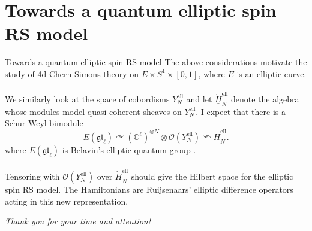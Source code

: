 \documentclass[11pt]{beamer}
\theoremstyle{remark}
\theoremstyle{remark}
\newcommand{\C}{\mathbb{C}}
\begin{document}
\section{Towards a quantum elliptic spin RS model}

\begin{frame}{Towards a quantum elliptic spin RS model}
The above considerations motivate the study of 4d Chern-Simons theory on $E \times S^1 \times [0,1]$, where $E$ is an elliptic curve.
\\~\\
We similarly look at the space of cobordisms $Y_N^\text{ell}$ and let $\underline{\dot H}_N^\text{ell}$ denote the algebra whose modules model quasi-coherent sheaves on $Y_N^\text{ell}$. I expect that there is a Schur-Weyl bimodule
\begin{equation*}
E(\mathfrak{gl}_\ell) \curvearrowright (\C^\ell)^{\otimes N} \otimes \mathcal{O}(Y_N^\text{ell}) \curvearrowleft \underline{\dot H}_N^\text{ell}.
\end{equation*}
where $E(\mathfrak{gl}_\ell)$ is Belavin's elliptic quantum group \cite{article:costello:2018b,article:etingof:1998}.
\\~\\
Tensoring with $\mathcal{O}(Y_N^\text{ell})$ over $\underline{\dot H}_N^\text{ell}$ should give the Hilbert space for the elliptic spin RS model. The Hamiltonians are Ruijsenaars' elliptic difference operators acting in this new representation.
\end{frame}

\begin{frame}
\begin{center}
\textit{Thank you for your time and attention!}
\end{center}
\end{frame}

\begin{frame}[allowframebreaks]


\end{frame}
\end{document}
